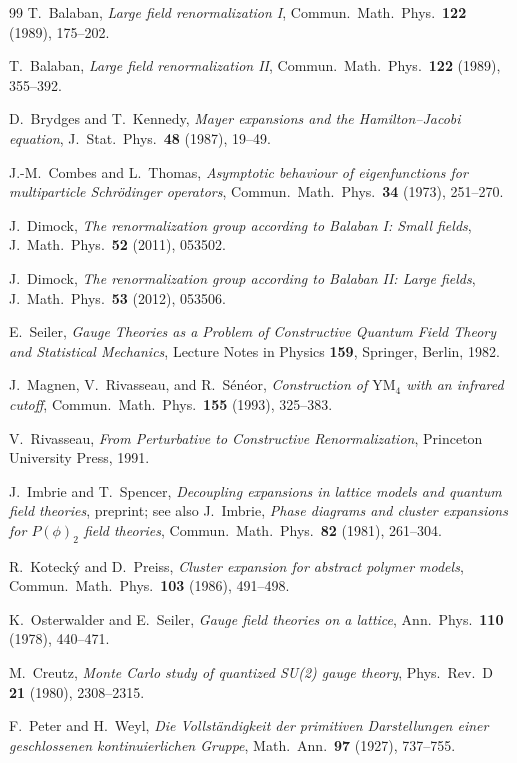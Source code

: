 \documentclass[11pt,a4paper]{amsart}
\theoremstyle{definition}
\begin{document}
\begin{thebibliography}{99}
T.~Balaban,
\textit{Large field renormalization I},
Commun.~Math.~Phys.\ \textbf{122} (1989), 175--202.

T.~Balaban,
\textit{Large field renormalization II},
Commun.~Math.~Phys.\ \textbf{122} (1989), 355--392.

D.~Brydges and T.~Kennedy,
\textit{Mayer expansions and the Hamilton--Jacobi equation},
J.~Stat.~Phys.\ \textbf{48} (1987), 19--49.

J.-M.~Combes and L.~Thomas,
\textit{Asymptotic behaviour of eigenfunctions for multiparticle Schr\"odinger operators},
Commun.~Math.~Phys.\ \textbf{34} (1973), 251--270.

J.~Dimock,
\textit{The renormalization group according to Balaban I: Small fields},
J.~Math.~Phys.\ \textbf{52} (2011), 053502.

J.~Dimock,
\textit{The renormalization group according to Balaban II: Large fields},
J.~Math.~Phys.\ \textbf{53} (2012), 053506.

E.~Seiler,
\textit{Gauge Theories as a Problem of Constructive Quantum Field Theory
and Statistical Mechanics},
Lecture Notes in Physics \textbf{159}, Springer, Berlin, 1982.

J.~Magnen, V.~Rivasseau, and R.~S\'en\'eor,
\textit{Construction of $\mathrm{YM}_4$ with an infrared cutoff},
Commun.~Math.~Phys.\ \textbf{155} (1993), 325--383.

V.~Rivasseau,
\textit{From Perturbative to Constructive Renormalization},
Princeton University Press, 1991.

J.~Imbrie and T.~Spencer,
\textit{Decoupling expansions in lattice models and quantum field theories},
preprint; see also J.~Imbrie,
\textit{Phase diagrams and cluster expansions for $P(\phi)_2$ field theories},
Commun.~Math.~Phys.\ \textbf{82} (1981), 261--304.

R.~Koteck\'y and D.~Preiss,
\textit{Cluster expansion for abstract polymer models},
Commun.~Math.~Phys.\ \textbf{103} (1986), 491--498.

K.~Osterwalder and E.~Seiler,
\textit{Gauge field theories on a lattice},
Ann.~Phys.\ \textbf{110} (1978), 440--471.

M.~Creutz,
\textit{Monte Carlo study of quantized SU(2) gauge theory},
Phys.~Rev.~D \textbf{21} (1980), 2308--2315.

F.~Peter and H.~Weyl,
\textit{Die Vollst\"andigkeit der primitiven Darstellungen einer geschlossenen
kontinuierlichen Gruppe},
Math.~Ann.\ \textbf{97} (1927), 737--755.


\end{thebibliography}
\end{document}
